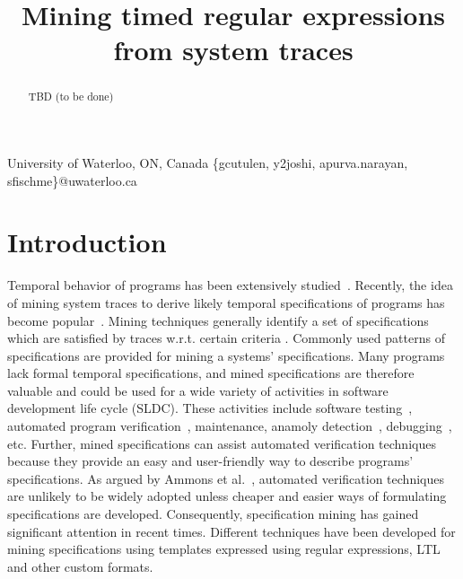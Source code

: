 \documentclass[]{sigplanconf}
\begin{document}
\title{Mining timed regular expressions from system traces}

		   {University of Waterloo, ON, Canada}
		   {\{gcutulen, y2joshi, apurva.narayan, sfischme\}@uwaterloo.ca}

\maketitle


\begin{abstract}

TBD (to be done)

\end{abstract}

\section{Introduction}
Temporal behavior of programs has been extensively studied~\cite{xyz}. Recently, the idea of mining system traces to derive likely temporal specifications of programs has become popular~\cite{abc}. Mining techniques generally identify a set of specifications which are satisfied by traces w.r.t. certain criteria . Commonly used patterns of specifications are provided for mining a systems' specifications. Many programs lack formal temporal specifications, and mined specifications are therefore valuable and could be used for a wide variety of activities in software development life cycle (SLDC). These activities include software testing~\cite{abc}, automated program verification~\cite{abc}, maintenance, anamoly detection~\cite{abc}, debugging~\cite{abc}, etc. Further, mined specifications can assist automated verification techniques because they provide an easy and user-friendly way to describe programs' specifications. As argued by Ammons et al.~\cite{DBLP:conf/popl/AmmonsBL02}, automated verification techniques are unlikely to be widely adopted unless cheaper and easier ways of formulating specifications are developed. Consequently, specification mining has gained significant attention in recent times. Different techniques have been developed for mining specifications using templates expressed using regular expressions, LTL and other custom formats.
\end{document}
